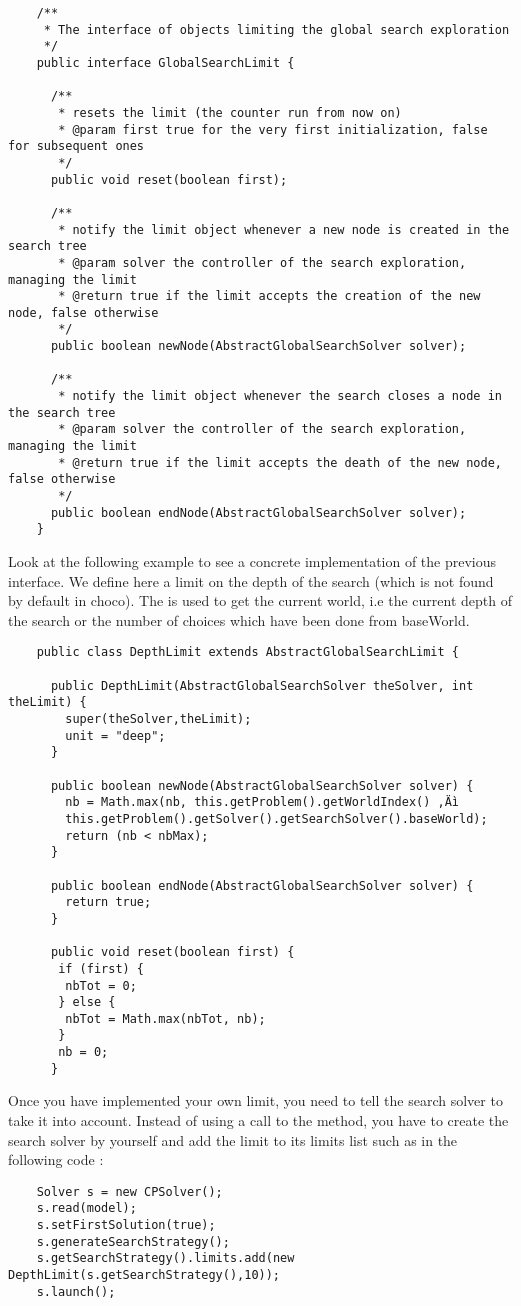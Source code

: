\begin{lstlisting}
	/**
	 * The interface of objects limiting the global search exploration
	 */
	public interface GlobalSearchLimit {

	  /**
	   * resets the limit (the counter run from now on)
	   * @param first true for the very first initialization, false for subsequent ones
	   */
	  public void reset(boolean first);
	
	  /**
	   * notify the limit object whenever a new node is created in the search tree
	   * @param solver the controller of the search exploration, managing the limit
	   * @return true if the limit accepts the creation of the new node, false otherwise
	   */
	  public boolean newNode(AbstractGlobalSearchSolver solver);
	
	  /**
	   * notify the limit object whenever the search closes a node in the search tree
	   * @param solver the controller of the search exploration, managing the limit
	   * @return true if the limit accepts the death of the new node, false otherwise
	   */
	  public boolean endNode(AbstractGlobalSearchSolver solver);
	}
\end{lstlisting}

Look at the following example to see a concrete implementation of the previous interface. We define here a limit on the depth of the search (which is not found by default in choco). The  is used to get the current world, i.e the current depth of the search or the number of choices which have been done from baseWorld. 

\begin{lstlisting}
	public class DepthLimit extends AbstractGlobalSearchLimit {
	
	  public DepthLimit(AbstractGlobalSearchSolver theSolver, int theLimit) {
	    super(theSolver,theLimit);
	    unit = "deep";
	  }
	
	  public boolean newNode(AbstractGlobalSearchSolver solver) {
	    nb = Math.max(nb, this.getProblem().getWorldIndex() ‚Äì
	    this.getProblem().getSolver().getSearchSolver().baseWorld);
	    return (nb < nbMax);
	  }
	
	  public boolean endNode(AbstractGlobalSearchSolver solver) {
	    return true;
	  }
	
	  public void reset(boolean first) {
	   if (first) {
	    nbTot = 0;
	   } else {
	    nbTot = Math.max(nbTot, nb);
	   }
	   nb = 0;
	  }
\end{lstlisting}

Once you have implemented your own limit, you need to tell the search solver to take it into account. Instead of using a call to the  method, you have to create the search solver by yourself and add the limit to its limits list such as in the following code :
\begin{lstlisting}
	Solver s = new CPSolver();
	s.read(model);
	s.setFirstSolution(true);
	s.generateSearchStrategy();
	s.getSearchStrategy().limits.add(new DepthLimit(s.getSearchStrategy(),10));
	s.launch();
\end{lstlisting}

